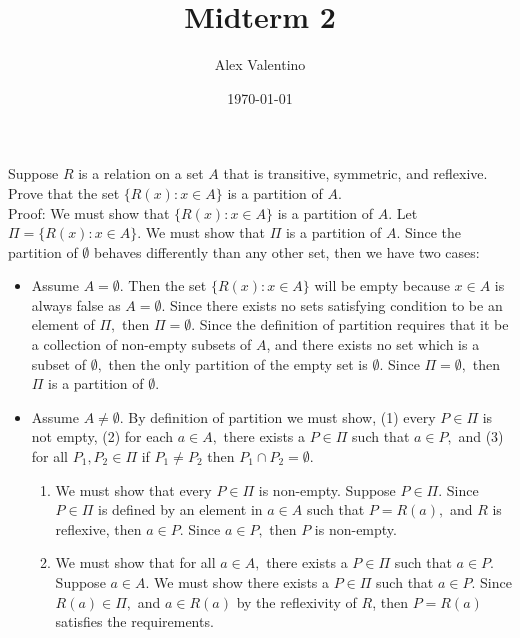 \documentclass[12pt, letterpaper]{article}
\date{\today}
\author{Alex Valentino}
\title{Midterm 2}
\begin{document}
	Suppose $R$ is a relation on a set $A$ that is transitive, symmetric, and reflexive.  Prove that the set $\{R(x): x \in A \}$ is a partition of $A$.\\
	
	Proof:  We must show that $\{R(x): x \in A \}$ is a partition of $A$.  Let $\Pi = \{R(x): x \in A \}$.  We must show that $\Pi$ is a partition of $A$.  Since the partition of $\emptyset$ behaves differently than any other set, then we have two cases:
	\begin{itemize}
		\item Assume $A = \emptyset$. Then the set $\{R(x): x \in A\}$ will be empty because $x \in A$ is always false as $A = \emptyset.$   Since there exists no sets satisfying condition to be an element of $\Pi,$ then $\Pi = \emptyset.$  Since the definition of partition  requires that it be a collection of non-empty subsets of $A$, and there exists no set which is a subset of $\emptyset,$ then the only partition of the empty set is $\emptyset.$  Since $\Pi = \emptyset,$ then $\Pi$ is a partition of $\emptyset$.
		\item Assume $A \neq \emptyset$.  By definition of partition we must show, (1) every $P \in \Pi$ is not empty, (2) for each $a \in A,$ there exists a $P \in \Pi$ such that $a \in P,$ and (3) for all $ P_1, P_2 \in \Pi$ if $P_1 \neq P_2$ then $P_1 \cap P_2 = \emptyset.$ 
		\begin{enumerate}
			\item We must show that every $P \in \Pi$ is non-empty.  Suppose $P \in \Pi.$  Since $P\in \Pi$ is defined by an element in $a \in A$ such that $P = R(a),$ and $R$ is reflexive, then $a \in P.$ Since $a \in P,$ then $P$ is non-empty.
			\item  We must show that for all $a \in A,$ there exists a $P \in \Pi$ such that $a \in P$.  Suppose $a \in A.$ We must show there exists a $P \in \Pi$ such that $a \in P.$ Since $R(a) \in \Pi,$ and $a \in R(a)$ by the reflexivity of $R$, then $P=R(a)$ satisfies the requirements.
			
			

\end{enumerate}
\end{itemize}
\end{document}

